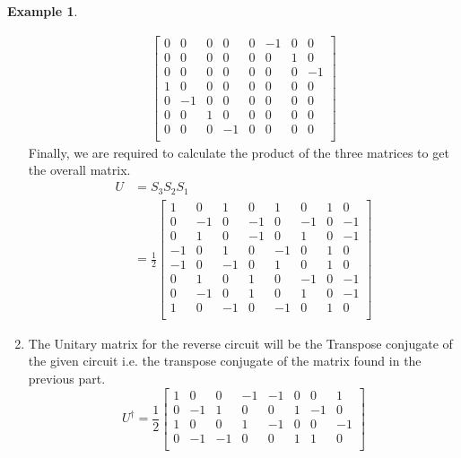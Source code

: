 \documentclass[12pt, oneside]{book}
\theoremstyle{definition}
\theoremstyle{definition}
\newtheorem{example}{Example}[section]
\theoremstyle{remark}
\begin{document}
\begin{example}
\begin{enumerate}
\begin{align*}
\begin{bmatrix}
                0 & 0 & 0 & 0 & 0 & -1 & 0 & 0 \\
                0 & 0 & 0 & 0 & 0 & 0 & 1 & 0 \\
                0 & 0 & 0 & 0 & 0 & 0 & 0 & -1 \\
                1 & 0 & 0 & 0 & 0 & 0 & 0 & 0 \\
                0 & -1 & 0 & 0 & 0 & 0 & 0 & 0 \\
                0 & 0 & 1 & 0 & 0 & 0 & 0 & 0 \\
                0 & 0 & 0 & -1 & 0 & 0 & 0 & 0 \\
            \end{bmatrix} 
        \end{align*}
        Finally, we are required to calculate the product of the three matrices to get the overall matrix.
        \begin{align*} 
            U &= S_3S_2S_1 \\
            &= \frac{1}{2}\begin{bmatrix} 
                1 & 0 & 1 & 0 & 1 & 0 & 1 & 0 \\
                0 & -1 & 0 & -1 & 0 & -1 & 0 & -1 \\
                0 & 1 & 0 & -1 & 0 & 1 & 0 & -1 \\
                -1 & 0 & 1 & 0 & -1 & 0 & 1 & 0 \\
                -1 & 0 & -1 & 0 & 1 & 0 & 1 & 0 \\
                0 & 1 & 0 & 1 & 0 & -1 & 0 & -1 \\
                0 & -1 & 0 & 1 & 0 & 1 & 0 & -1 \\
                1 & 0 & -1 & 0 & -1 & 0 & 1 & 0 \\
            \end{bmatrix}
        \end{align*}
        \item The Unitary matrix for the reverse circuit will be the Transpose conjugate of the given circuit i.e. the transpose conjugate of the matrix found in the previous part.
        \[
            U^{\dagger}=\frac{1}{2}\begin{bmatrix} 
                1 & 0 & 0 & -1 & -1 & 0 & 0 & 1 \\
                0 & -1 & 1 & 0 & 0 & 1 & -1 & 0 \\
                1 & 0 & 0 & 1 & -1 & 0 & 0 & -1 \\
                0 & -1 & -1 & 0 & 0 & 1 & 1 & 0 \\

\end{bmatrix}\]
\end{enumerate}
\end{example}
\end{document}
